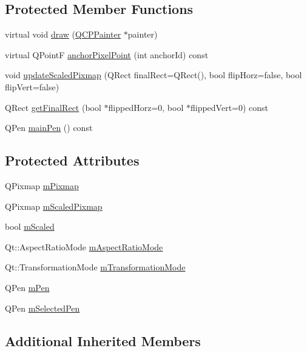 \subsection*{Protected Member Functions}
\begin{DoxyCompactItemize}
\item 
virtual void \hyperlink{classQCPItemPixmap_a879e8076c2db01a38b34cfa73ec95d2f}{draw} (\hyperlink{classQCPPainter}{Q\+C\+P\+Painter} $\ast$painter)
\item 
virtual Q\+PointF \hyperlink{classQCPItemPixmap_a88abce3c1027f371cddcf6dad35ffbb1}{anchor\+Pixel\+Point} (int anchor\+Id) const 
\item 
void \hyperlink{classQCPItemPixmap_a8bced3027b326b290726cd1979c7cfc6}{update\+Scaled\+Pixmap} (Q\+Rect final\+Rect=Q\+Rect(), bool flip\+Horz=false, bool flip\+Vert=false)
\item 
Q\+Rect \hyperlink{classQCPItemPixmap_a245ef0c626cab7096a810442f2f6a2d9}{get\+Final\+Rect} (bool $\ast$flipped\+Horz=0, bool $\ast$flipped\+Vert=0) const 
\item 
Q\+Pen \hyperlink{classQCPItemPixmap_af21085516585c475dc9d839e7f377233}{main\+Pen} () const 
\end{DoxyCompactItemize}
\subsection*{Protected Attributes}
\begin{DoxyCompactItemize}
\item 
Q\+Pixmap \hyperlink{classQCPItemPixmap_a1396cce7f26c7b8e9512906284380c4d}{m\+Pixmap}
\item 
Q\+Pixmap \hyperlink{classQCPItemPixmap_a2ebc66e15b9f1264563d58f29ba1bc00}{m\+Scaled\+Pixmap}
\item 
bool \hyperlink{classQCPItemPixmap_a8fe670a529cd46a9b8afd9fc1203bc3f}{m\+Scaled}
\item 
Qt\+::\+Aspect\+Ratio\+Mode \hyperlink{classQCPItemPixmap_a8dc6b6c1e106ac523efae22d5fe55bab}{m\+Aspect\+Ratio\+Mode}
\item 
Qt\+::\+Transformation\+Mode \hyperlink{classQCPItemPixmap_ac9ecad3b9842363754e32eda2cf821bd}{m\+Transformation\+Mode}
\item 
Q\+Pen \hyperlink{classQCPItemPixmap_acfee1124eb51a1887aaf8de10777c7a1}{m\+Pen}
\item 
Q\+Pen \hyperlink{classQCPItemPixmap_a0949e5bb6a261fc4e9668e28e2effcfa}{m\+Selected\+Pen}
\end{DoxyCompactItemize}
\subsection*{Additional Inherited Members}


